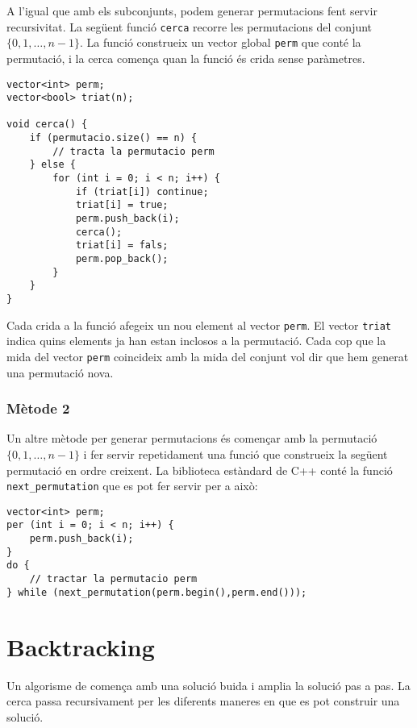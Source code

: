 A l'igual que amb els subconjunts, podem generar permutacions
fent servir recursivitat.
La següent funció \texttt{cerca} recorre
les permutacions del conjunt $\{0,1,\ldots,n-1\}$.
La funció construeix un vector global \texttt{perm}
que conté la permutació,
i la cerca comença quan la funció és
crida sense paràmetres.

\begin{lstlisting}
vector<int> perm;
vector<bool> triat(n);

void cerca() {
    if (permutacio.size() == n) {
        // tracta la permutacio perm
    } else {
        for (int i = 0; i < n; i++) {
            if (triat[i]) continue;
            triat[i] = true;
            perm.push_back(i);
            cerca();
            triat[i] = fals;
            perm.pop_back();
        }
    }
}
\end{lstlisting}

Cada crida a la funció afegeix un nou element
al vector \texttt{perm}.
El vector \texttt{triat} indica quins
elements ja han estan inclosos a la permutació.
Cada cop que la mida del vector \texttt{perm}
coincideix amb la mida del conjunt vol dir que hem generat
una permutació nova.

\subsubsection{Mètode 2}


Un altre mètode per generar permutacions
és començar amb la permutació
$\{0,1,\ldots,n-1\}$ i fer servir repetidament
una funció que construeix la següent permutació
en ordre creixent.
La biblioteca estàndard de C++ conté la funció
\texttt{next\_permutation} que es pot fer servir per a això:

\begin{lstlisting}
vector<int> perm;
per (int i = 0; i < n; i++) {
    perm.push_back(i);
}
do {
    // tractar la permutacio perm
} while (next_permutation(perm.begin(),perm.end()));
\end{lstlisting}

\section{Backtracking}


Un algorisme de 
comença amb una solució buida
i amplia la solució pas a pas.
La cerca passa recursivament
per les diferents maneres en que es
pot construir una solució.

